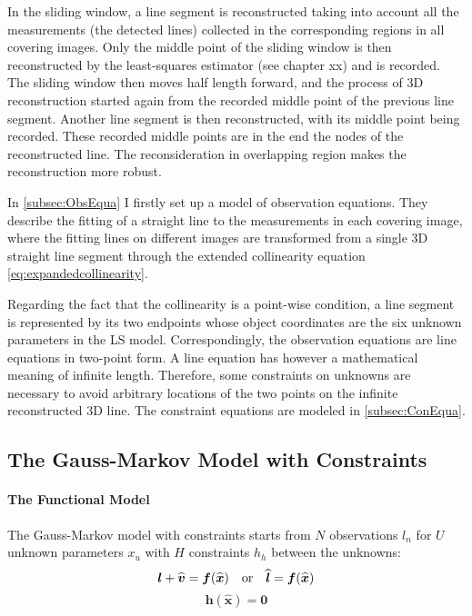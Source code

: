 In the sliding window, a line segment is reconstructed taking into account all the measurements (the detected lines) collected in the corresponding regions in all covering images. Only the middle point of the sliding window is then reconstructed by the least-squares estimator (see chapter xx) %
and is recorded. The sliding window then moves half length forward, and the process of 3D reconstruction started again from the recorded middle point of the previous line segment. Another line segment is then reconstructed, with its middle point being recorded. These recorded middle points are in the end the nodes of the reconstructed line. The reconsideration in overlapping region makes the reconstruction more robust.

In \cref{subsec:ObsEqua} I firstly set up a model of observation equations. They describe the fitting of a straight line to the measurements in each covering image, where the fitting lines on different images are transformed from a single 3D straight line segment through the extended collinearity equation \eqref{eq:expandedcollinearity}.

Regarding the fact that the collinearity is a point-wise condition, a line segment is represented by its two endpoints whose object coordinates are the six unknown parameters %
in the LS model. %
Correspondingly, the observation equations are line equations in two-point form. A line equation has however a mathematical meaning of infinite length. Therefore, some constraints on unknowns are necessary to avoid arbitrary locations of the two points on the infinite reconstructed 3D line. The constraint equations are modeled in \cref{subsec:ConEqua}.



\subsection{The Gauss-Markov Model with Constraints}
\label{GaussMarkovModelwithConstraints}

\paragraph{The Functional Model}
The Gauss-Markov model with constraints starts from $N$ observations $l_n$ for $U$ unknown parameters $x_u$ with $H$ constraints $h_h$ between the unknowns:
\begin{equation} \label{eq:GM-ObsEq}
\boldsymbol l+\widehat{\boldsymbol v}=\boldsymbol f(\widehat{\boldsymbol x})\quad \textnormal{or}\quad \widehat{\boldsymbol l}=\boldsymbol f(\widehat{\boldsymbol x})
\end{equation}
\begin{equation} \label{eq:GM-ConEq}
\boldsymbol h(\widehat{\boldsymbol x})=\mathbf{0}
\end{equation}

